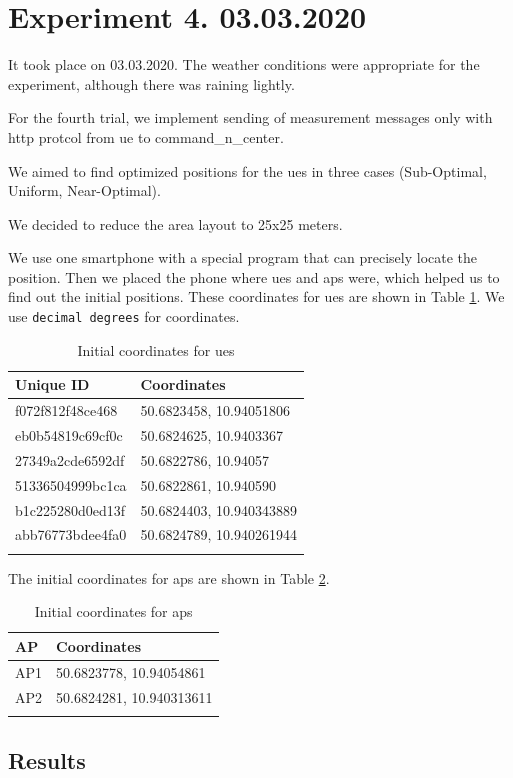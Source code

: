 \section{Experiment 4. 03.03.2020}\label{experiment-4.-03.03.2020}

It took place on 03.03.2020. The weather conditions were appropriate for the experiment, although there was raining lightly.

For the fourth trial, we implement sending of measurement messages only with \gls{http} protcol from \gls{ue} to \gls{command_n_center}. 

We aimed to find optimized positions for the \glspl{ue} in three cases (Sub-Optimal, Uniform, Near-Optimal).

We decided to reduce the area layout to 25x25 meters.

We use one smartphone with a special program that can precisely locate the position. Then we placed the phone where \glspl{ue} and \glspl{ap} were, which helped us to find out the initial positions. These coordinates for \glspl{ue} are shown in Table \ref{tab:exp4-initial-coordinates-ues}. We use \texttt{decimal degrees} for coordinates.

\begin{longtable}[]{@{}ll@{}}
	\caption{Initial coordinates for \glspl{ue}}\tabularnewline
	\toprule
	Unique ID & Coordinates\tabularnewline
	\midrule
	\endhead
	f072f812f48ce468 & 50.6823458, 10.94051806\tabularnewline
	eb0b54819c69cf0c & 50.6824625, 10.9403367\tabularnewline
	27349a2cde6592df & 50.6822786, 10.94057\tabularnewline
	51336504999bc1ca & 50.6822861, 10.940590\tabularnewline
	b1c225280d0ed13f & 50.6824403, 10.940343889\tabularnewline
	abb76773bdee4fa0 & 50.6824789, 10.940261944\tabularnewline
	\label{tab:exp4-initial-coordinates-ues}
\end{longtable}


The initial coordinates for \glspl{ap} are shown in Table \ref{tab:exp4-initial-coordinates-aps}.

\begin{longtable}[]{@{}ll@{}}
	\caption{Initial coordinates for \glspl{ap} }\tabularnewline
	\toprule
	AP & Coordinates\tabularnewline
	\midrule
	\endhead
	AP1 & 50.6823778, 10.94054861\tabularnewline
	AP2 & 50.6824281, 10.940313611\tabularnewline
	\bottomrule
	\label{tab:exp4-initial-coordinates-aps}
\end{longtable}

\subsection{Results}

